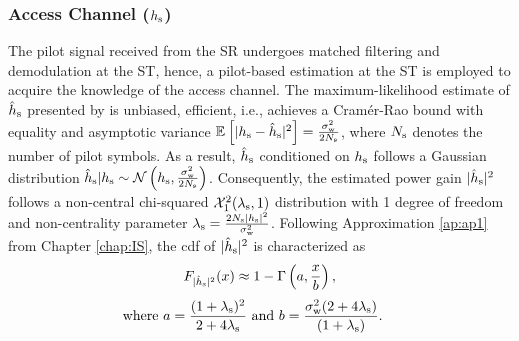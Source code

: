\subsubsection*{Access Channel ($h_{\text{s}}$)}
The pilot signal received from the SR undergoes matched filtering and demodulation at the ST, hence, a pilot-based estimation at the ST is employed to acquire the knowledge of the access channel. The maximum-likelihood estimate of $\hat{h}_{\text{s}}$ presented by \cite{Gifford08} is unbiased, efficient, i.e., achieves a Cram\'er-Rao bound with equality and asymptotic variance ${\mathbb E}_{}\left[ |h_{\text{s}} -\hat{h}_{\text{s}}|^2 \right] = \frac{\sigma^2_{\text{w}}}{2 N_{\text{s}}}$, where $N_{\text{s}}$ denotes the number of pilot symbols. As a result, $\hat{h}_{\text{s}}$ conditioned on $h_{\text{s}}$ follows a Gaussian distribution
$\hat{h}_{\text{s}}|h_{\text{s}} \sim \mathcal{N}\left( h_{\text{s}},\frac{\sigma^2_{\text{w}}}{2 N_{\text{s}}} \right)$.
Consequently, the estimated power gain $|\hat{h}_{\text{s}}|^2$ follows a non-central chi-squared $\ncchi2(\ls, 1)$ distribution with 1 degree of freedom and non-centrality parameter $\lambda_{\text{s}} = \frac{2 N_{\text{s}} |h_{\text{s}}|^2}{\sigma^2_{\text{w}}}$. 
Following Approximation \ref{ap:ap1} from Chapter \ref{chap:IS}, the cdf of $|\hat{h}_{\text{s}}|^2$ is characterized as
\begin{align}
F_{|\hat{h}_{\text{s}}|^2}(x) \approx 1 - \Gamma \left(a, \frac{x}{b} \right) \label{eq_HS:fephs}, 
\end{align}
\begin{align}
\text{where  } a = \frac{(1 + \lambda_{\text{s}})^2}{2 + 4 \lambda_{\text{s}}} &\text{ and } b = \frac{\sigma^2_{\text{w}} (2 + 4 \lambda_{\text{s}})}{(1 + \lambda_{\text{s}})}.  \label{eq_HS:para_hs} 
\end{align}

